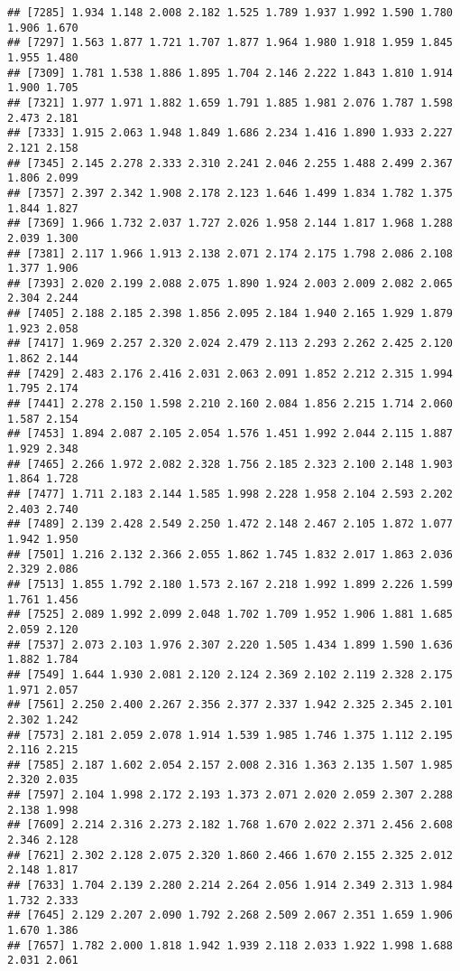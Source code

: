 \documentclass[
]{article}
\begin{document}
\begin{verbatim}
## [7285] 1.934 1.148 2.008 2.182 1.525 1.789 1.937 1.992 1.590 1.780 1.906 1.670
## [7297] 1.563 1.877 1.721 1.707 1.877 1.964 1.980 1.918 1.959 1.845 1.955 1.480
## [7309] 1.781 1.538 1.886 1.895 1.704 2.146 2.222 1.843 1.810 1.914 1.900 1.705
## [7321] 1.977 1.971 1.882 1.659 1.791 1.885 1.981 2.076 1.787 1.598 2.473 2.181
## [7333] 1.915 2.063 1.948 1.849 1.686 2.234 1.416 1.890 1.933 2.227 2.121 2.158
## [7345] 2.145 2.278 2.333 2.310 2.241 2.046 2.255 1.488 2.499 2.367 1.806 2.099
## [7357] 2.397 2.342 1.908 2.178 2.123 1.646 1.499 1.834 1.782 1.375 1.844 1.827
## [7369] 1.966 1.732 2.037 1.727 2.026 1.958 2.144 1.817 1.968 1.288 2.039 1.300
## [7381] 2.117 1.966 1.913 2.138 2.071 2.174 2.175 1.798 2.086 2.108 1.377 1.906
## [7393] 2.020 2.199 2.088 2.075 1.890 1.924 2.003 2.009 2.082 2.065 2.304 2.244
## [7405] 2.188 2.185 2.398 1.856 2.095 2.184 1.940 2.165 1.929 1.879 1.923 2.058
## [7417] 1.969 2.257 2.320 2.024 2.479 2.113 2.293 2.262 2.425 2.120 1.862 2.144
## [7429] 2.483 2.176 2.416 2.031 2.063 2.091 1.852 2.212 2.315 1.994 1.795 2.174
## [7441] 2.278 2.150 1.598 2.210 2.160 2.084 1.856 2.215 1.714 2.060 1.587 2.154
## [7453] 1.894 2.087 2.105 2.054 1.576 1.451 1.992 2.044 2.115 1.887 1.929 2.348
## [7465] 2.266 1.972 2.082 2.328 1.756 2.185 2.323 2.100 2.148 1.903 1.864 1.728
## [7477] 1.711 2.183 2.144 1.585 1.998 2.228 1.958 2.104 2.593 2.202 2.403 2.740
## [7489] 2.139 2.428 2.549 2.250 1.472 2.148 2.467 2.105 1.872 1.077 1.942 1.950
## [7501] 1.216 2.132 2.366 2.055 1.862 1.745 1.832 2.017 1.863 2.036 2.329 2.086
## [7513] 1.855 1.792 2.180 1.573 2.167 2.218 1.992 1.899 2.226 1.599 1.761 1.456
## [7525] 2.089 1.992 2.099 2.048 1.702 1.709 1.952 1.906 1.881 1.685 2.059 2.120
## [7537] 2.073 2.103 1.976 2.307 2.220 1.505 1.434 1.899 1.590 1.636 1.882 1.784
## [7549] 1.644 1.930 2.081 2.120 2.124 2.369 2.102 2.119 2.328 2.175 1.971 2.057
## [7561] 2.250 2.400 2.267 2.356 2.377 2.337 1.942 2.325 2.345 2.101 2.302 1.242
## [7573] 2.181 2.059 2.078 1.914 1.539 1.985 1.746 1.375 1.112 2.195 2.116 2.215
## [7585] 2.187 1.602 2.054 2.157 2.008 2.316 1.363 2.135 1.507 1.985 2.320 2.035
## [7597] 2.104 1.998 2.172 2.193 1.373 2.071 2.020 2.059 2.307 2.288 2.138 1.998
## [7609] 2.214 2.316 2.273 2.182 1.768 1.670 2.022 2.371 2.456 2.608 2.346 2.128
## [7621] 2.302 2.128 2.075 2.320 1.860 2.466 1.670 2.155 2.325 2.012 2.148 1.817
## [7633] 1.704 2.139 2.280 2.214 2.264 2.056 1.914 2.349 2.313 1.984 1.732 2.333
## [7645] 2.129 2.207 2.090 1.792 2.268 2.509 2.067 2.351 1.659 1.906 1.670 1.386
## [7657] 1.782 2.000 1.818 1.942 1.939 2.118 2.033 1.922 1.998 1.688 2.031 2.061

\end{verbatim}
\end{document}
